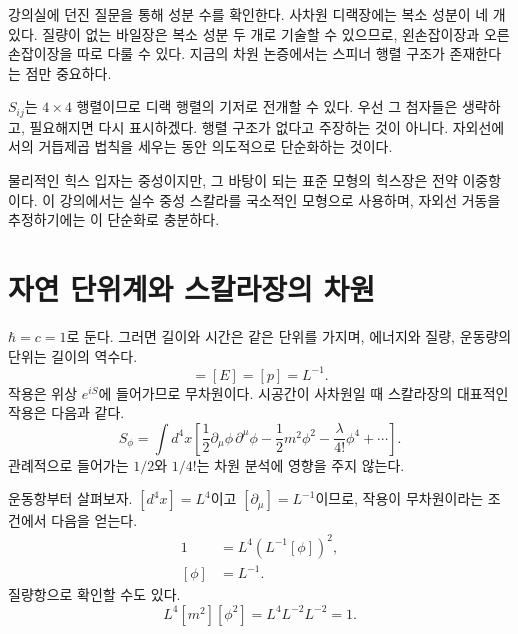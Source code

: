 강의실에 던진 질문을 통해 성분 수를 확인한다. 사차원 디랙장에는 복소 성분이 네 개 있다. 질량이 없는 바일장은 복소 성분 두 개로 기술할 수 있으므로, 왼손잡이장과 오른손잡이장을 따로 다룰 수 있다. 지금의 차원 논증에서는 스피너 행렬 구조가 존재한다는 점만 중요하다.

\(S_{ij}\)는 \(4\times4\) 행렬이므로 디랙 행렬의 기저로 전개할 수 있다. 우선 그 첨자들은 생략하고, 필요해지면 다시 표시하겠다. 행렬 구조가 없다고 주장하는 것이 아니다. 자외선에서의 거듭제곱 법칙을 세우는 동안 의도적으로 단순화하는 것이다.

\begin{classroomqa}
\end{classroomqa}

물리적인 힉스 입자는 중성이지만, 그 바탕이 되는 표준 모형의 힉스장은 전약 이중항이다. 이 강의에서는 실수 중성 스칼라를 국소적인 모형으로 사용하며, 자외선 거동을 추정하기에는 이 단순화로 충분하다.

\section{자연 단위계와 스칼라장의 차원}

\(\hbar=c=1\)로 둔다. 그러면 길이와 시간은 같은 단위를 가지며, 에너지와 질량, 운동량의 단위는 길이의 역수다.
\begin{equation}
[m]=[E]=[p]=L^{-1}.
\end{equation}
작용은 위상 \(e^{iS}\)에 들어가므로 무차원이다. 시공간이 사차원일 때 스칼라장의 대표적인 작용은 다음과 같다.
\begin{equation}
S_\phi=\int d^4x\left[
\frac12\partial_\mu\phi\,\partial^\mu\phi
-\frac12m^2\phi^2
-\frac{\lambda}{4!}\phi^4
+\cdots\right].
\end{equation}
관례적으로 들어가는 \(1/2\)와 \(1/4!\)는 차원 분석에 영향을 주지 않는다.

운동항부터 살펴보자. \([d^4x]=L^4\)이고 \([\partial_\mu]=L^{-1}\)이므로, 작용이 무차원이라는 조건에서 다음을 얻는다.
\begin{align}
1
&=L^4\left(L^{-1}[\phi]\right)^2,\\
[\phi]&=L^{-1}.
\end{align}
질량항으로 확인할 수도 있다.
\begin{equation}
L^4[m^2][\phi^2]
=L^4L^{-2}L^{-2}=1.
\end{equation}

